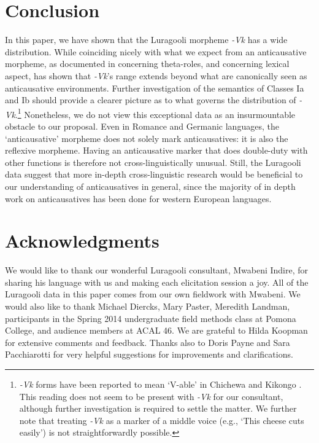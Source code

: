\documentclass[output=paper]{langsci/langscibook}
\begin{document}
\section{Conclusion}

In this paper, we have shown that the Luragooli morpheme \textit{-Vk} has a wide distribution. While coinciding nicely with what we expect from an anticausative morpheme, as documented in  concerning theta-roles, and  concerning lexical aspect,  has shown that \textit{-Vk}’s range extends beyond what are canonically seen as anticausative environments. Further investigation of the semantics of Classes Ia and Ib should provide a clearer picture as to what governs the distribution of \textit{-Vk}.\footnote{ \textit{-Vk} forms have been reported to mean ‘V-able’ in Chichewa \citep{Simango2009} and Kikongo \citep{Fernando2013}. This reading does not seem to be present with \textit{-Vk} for our consultant, although further investigation is required to settle the matter. We further note that treating \textit{-Vk} as a marker of a middle voice (e.g., ‘This cheese cuts easily’) is not straightforwardly possible.} Nonetheless, we do not view this exceptional data as an insurmountable obstacle to our proposal. Even in Romance and Germanic languages, the ‘anticausative’ morpheme does not solely mark anticausatives: it is also the reflexive morpheme. Having an anticausative marker that does double-duty with other functions is therefore not cross-linguistically unusual. Still, the Luragooli data suggest that more in-depth cross-linguistic research would be beneficial to our understanding of anticausatives in general, since the majority of in depth work on anticausatives has been done for western European languages.

\section*{Acknowledgments}

We would like to thank our wonderful Luragooli consultant, Mwabeni Indire, for sharing his language with us and making each elicitation session a joy. All of the Luragooli data in this paper comes from our own fieldwork with Mwabeni. We would also like to thank Michael Diercks, Mary Paster, Meredith Landman, participants in the Spring 2014 undergraduate field methods class at Pomona College, and audience members at ACAL 46. We are grateful to Hilda Koopman for extensive comments and feedback. Thanks also to Doris Payne and Sara Pacchiarotti for very helpful suggestions for improvements and clarifications.
\end{document}
